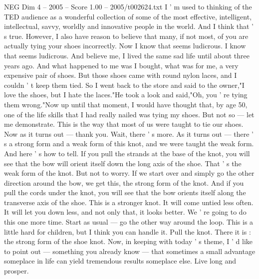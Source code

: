 \begin{textsample}{NEG Dim 4 – 2005 – Score 1.00 – 2005/t002624.txt}  \label{ex:f4_neg_067}
I ' m used to thinking of the TED audience as a wonderful collection of some of the most effective, intelligent, intellectual, savvy, worldly and innovative people in the world.
And I think that ' s true.
However, I also have reason to believe that many, if not most, of you are actually tying your shoes incorrectly.
Now I know that seems ludicrous.
I know that seems ludicrous.
And believe me, I lived the same sad life until about three years ago.
And what happened to me was I bought, what was for me, a very expensive pair of shoes.
But those shoes came with round nylon laces, and I couldn ' t keep them tied.
So I went back to the store and said to the owner,"I love the shoes, but I hate the laces."He took a look and said,"Oh, you ' re tying them wrong."Now up until that moment, I would have thought that, by age 50, one of the life skills that I had really nailed was tying my shoes.
But not so — let me demonstrate.
This is the way that most of us were taught to tie our shoes.
Now as it turns out — thank you.
Wait, there ' s more.
As it turns out — there ' s a strong form and a weak form of this knot, and we were taught the weak form.
And here ' s how to tell.
If you pull the strands at the base of the knot, you will see that the bow will orient itself down the long axis of the shoe.
That ' s the weak form of the knot.
But not to worry.
If we start over and simply go the other direction around the bow, we get this, the strong form of the knot.
And if you pull the cords under the knot, you will see that the bow orients itself along the transverse axis of the shoe.
This is a stronger knot.
It will come untied less often.
It will let you down less, and not only that, it looks better.
We ' re going to do this one more time.
Start as usual — go the other way around the loop.
This is a little hard for children, but I think you can handle it.
Pull the knot.
There it is : the strong form of the shoe knot.
Now, in keeping with today ' s theme, I ' d like to point out — something you already know — that sometimes a small advantage someplace in life can yield tremendous results someplace else.
Live long and prosper.

\end{textsample}
